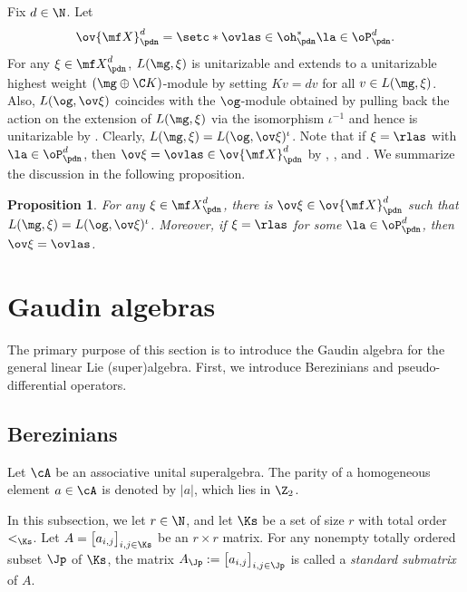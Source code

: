 \documentclass[11pt, reqno]{amsart}
\newtheorem{prop}[thm]{Proposition}
\theoremstyle{definition}
\theoremstyle{remark}
\numberwithin{equation}{section}
\begin{document}
Fix $d \in \N$.
Let
$$
\ov{\mf X}^d_\pdn=\setc*{ \ovlas \in \oh_\pdn^*}{ \la \in \oP^d_\pdn}.
$$
%
For any $\xi \in {\mf X}^d_\pdn$, $L(\mg, \xi)$ is unitarizable and extends to a unitarizable highest weight $(\mg\oplus \C K)$-module by setting $K v= d v$ for all $v \in  L(\mg, \xi)$.
Also, $L(\og, \ov\xi)$ coincides with the $\og$-module obtained by pulling back the action on the extension of $L(\mg, \xi)$ via the isomorphism $\iota^{-1}$ and hence is unitarizable by .
Clearly, $L(\mg, \xi)=L(\og, \ov\xi)^\iota$.
Note that if $\xi=\rlas$ with $\la  \in \oP^d_\pdn$, then $\ov\xi=\ovlas \in \ov{\mf X}^d_\pdn$ by , , and .
We summarize the discussion in the following proposition.

\begin{prop} \label{uni-K}
For any $\xi \in {\mf X}^d_\pdn$, there is $\ov\xi \in \ov{\mf X}^d_\pdn$ such that $L(\mg, \xi)=L(\og, \ov\xi)^\iota$.
Moreover, if $\xi=\rlas$ for some $\la  \in \oP^d_\pdn$, then $\ov\xi=\ovlas$.
\end{prop}



\section{Gaudin algebras} \label{Gaudin-alg}

The primary purpose of this section is to introduce the Gaudin algebra for the general linear Lie (super)algebra.
First, we introduce Berezinians and pseudo-differential operators.

\subsection{Berezinians}

Let $\cA$ be an associative unital superalgebra.
The parity of a homogeneous element $a \in \cA$ is denoted by $|a|$, which lies in $\Z_2$.

In this subsection, we let $r \in \N$, and let $\Ks$ be a set of size $r$ with total order $<_\Ks$.
Let $A=\big[a_{i,j}\big]_{i,j \in \Ks}$ be an $r \times r$ matrix. For any nonempty totally ordered subset $\Jp$ of $\Ks$, the matrix $A_{\Jp}:=\big[a_{i,j}\big]_{i,j \in \Jp}$ is called a \emph{standard submatrix} of $A$.
\end{document}
